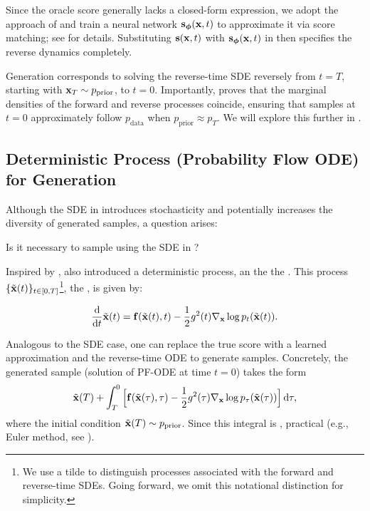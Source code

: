 Since the oracle score generally lacks a closed-form expression, we adopt the approach of  and train a neural network $\mathbf{s}_{\bm{\phi}}({\mathbf{x}}, t)$ to approximate it via score matching; see  for details. Substituting ${\mathbf{s}}({\mathbf{x}}, t)$ with $\mathbf{s}_{\bm{\phi}}({\mathbf{x}}, t)$ in  then specifies the reverse dynamics completely.

Generation corresponds to solving the reverse-time SDE reversely from $t = T$, starting with ${\mathbf{x}}_T \sim p_{\mathrm{prior}}$, to $t = 0$. Importantly, \citet{anderson1982reverse} proves that the marginal densities of the forward and reverse processes coincide, ensuring that samples at $t=0$ approximately follow $p_{\mathrm{data}}$ when $p_{\mathrm{prior}} \approx p_T$. We will explore this further in .






\subsection{Deterministic Process (Probability Flow ODE)  for Generation}\label{subsec:pf-ode}
 Although the SDE in  introduces stochasticity and potentially increases the diversity of generated samples, a question arises:
\begin{question}
    Is it necessary to sample using the SDE in ?
\end{question}

Inspired by \citet{maoutsa2020interacting}, \citet{song2020score} also introduced a deterministic process, an  the  the . This process $\{\tilde{{\mathbf{x}}}(t)\}_{t\in[0,T]}$\footnote{We use a tilde to distinguish processes associated with the forward and reverse-time SDEs. Going forward, we omit this notational distinction for simplicity.},  the , is given by:
\begin{mdframed}
    \begin{equation}\label{eq:prob_ode_gt}
    \frac{\mathop{}\!\mathrm{d}}{\mathop{}\!\mathrm{d} t}\tilde{{\mathbf{x}}}(t) = \mathbf{f}(\tilde{{\mathbf{x}}}(t), t) - \frac{1}{2} g^2(t) \nabla_{{\mathbf{x}}} \log p_t(\tilde{{\mathbf{x}}}(t)).
    \end{equation}
\end{mdframed}

Analogous to the SDE case, one can replace the true score with a learned approximation and  the reverse-time ODE  to generate samples. Concretely, the generated sample (solution of PF-ODE at time $t=0$) takes the form
\[
\tilde{{\mathbf{x}}}(T) + \int_{T}^{0} \Big[ \mathbf{f}(\tilde{{\mathbf{x}}}(\tau), \tau) - \frac{1}{2} g^2(\tau)  \nabla_{{\mathbf{x}}} \log p_\tau(\tilde{{\mathbf{x}}}(\tau)) \Big]   \mathop{}\!\mathrm{d} \tau,
\]
where the initial condition $\tilde{{\mathbf{x}}}(T) \sim p_{\mathrm{prior}}$. Since this integral is , practical  (e.g., Euler method, see ).

